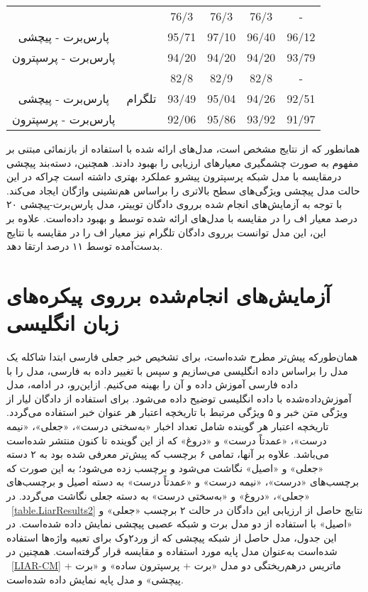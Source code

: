 \begin{itemize}
\begin{table}
\begin{center}
\begin{tabular}{|c|c|c|c|c|c|}
			\cline{1-1}
			\cline{3-6}
			\citep{jahanbakhsh2020model} &
			 & 76/3 & 76/3 & 76/3 & - \\
			\cline{1-1}
			\cline{3-6}
			پارس‌برت - پیچشی & & 95/71 & 97/10 & 96/40 & 96/12 \\
			\cline{1-1}
			\cline{3-6}
			پارس‌برت - پرسپترون & & 94/20 & 94/20 & 94/20 & 93/79 \\
			\hline
			\citep{jahanbakhsh2020model} &
			\multirow{3}{*}{تلگرام}& 82/8 & 82/9 & 82/8 & - \\
			\cline{1-1}
			\cline{3-6}
			پارس‌برت - پیچشی & & 93/49 & 95/04 & 94/26 & 92/51 \\
			\cline{1-1}
			\cline{3-6}
			پارس‌برت - پرسپترون & & 92/06 & 95/86 & 93/92 & 91/97 \\
			\hline
		\end{tabular}
	\end{center}
\end{table}
\end{itemize}
	
	همانطور که از نتایج مشخص است، مدل‌های ارائه شده با استفاده از بازنمائی‌ مبتنی بر مفهوم به صورت چشمگیری معیار‌های ارزیابی را بهبود دادند. همچنین، دسته‌بند پیچشی درمقایسه با مدل شبکه پرسپترون پیشرو عملکرد بهتری داشته است چراکه در این حالت مدل پیچشی ویژگی‌های سطح بالاتری را براساس هم‌نشینی واژگان ایجاد می‌کند. با توجه به آزمایش‌های انجام شده برروی دادگان توییتر، مدل پارس‌برت-پیچشی ۲۰ درصد معیار اف را در مقایسه با مدل‌های ارائه شده توسط \cite{zamani2017rumor} و \cite{jahanbakhsh2020model} بهبود‌ داده‌است. علاوه بر این، این مدل توانست برروی دادگان تلگرام نیز معیار اف را در مقایسه با نتایج بدست‌آمده توسط \cite{jahanbakhsh2020model} 
	۱۱ درصد ارتقا دهد.
	
\section{آزمایش‌های انجام‌شده برروی پیکره‌های زبان انگلیسی}
همان‌طورکه پیش‌تر مطرح شده‌است، برای تشخیص خبر جعلی فارسی ابتدا شاکله یک مدل را براساس داده انگلیسی می‌سازیم و سپس با تغییر داده به فارسی، مدل را با داده فارسی آموزش داده و آن را بهینه می‌کنیم. ازاین‌رو، در ادامه، مدل آموزش‌داده‌شده با داده انگلیسی توضیح داده می‌شود. برای استفاده از دادگان لیار از ویژگی متن خبر و ۵ ویژگی مرتبط با تاریخچه اعتبار هر عنوان خبر استفاده می‌گردد. 
تاریخچه اعتبار هر گوینده شامل تعداد اخبار «به‌سختی درست»، «جعلی»، «نیمه درست»، «عمدتاً درست» و «دروغ» که از این گوینده تا کنون منتشر شده‌است می‌باشد.
علاوه بر آنها، تمامی ۶ برچسب که پیش‌تر معرفی شده بود به ۲ دسته «جعلی» و «اصیل» نگاشت می‌شود و برچسب زده می‌شود؛
به این صورت که برچسب‌های «درست»، «نیمه درست» و «عمدتاً درست» به دسته اصیل و برچسب‌های «جعلی»،  «دروغ» و «به‌سختی درست» به دسته جعلی نگاشت می‌گردد.  در \tablename~\ref{table.LiarResults2} نتایج حاصل از ارزیابی این دادگان در حالت ۲ برچسب «جعلی» و «اصیل» با استفاده از دو مدل برت و شبکه عصبی پیچشی نمایش داده شده‌است. در این جدول، مدل حاصل از شبکه پیچشی که از ورد۲وک\citep{mikolov2013distributed} برای تعبیه‌ واژه‌ها استفاده شده‌است به‌عنوان مدل پایه مورد استفاده و مقایسه قرار گرفته‌است.  همچنین در \figurename~\ref{LIAR-CM} ماتریس درهم‌ریختگی دو مدل «برت + پرسپترون ساده» و «برت +‌ پیچشی» و مدل پایه نمایش داده شده‌است.

